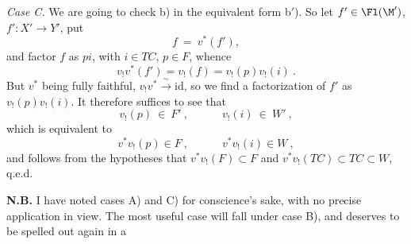 \textit{Case C.} We are going to check b) in the equivalent form b$'$). So let $f' \in \Fl(\M')$, $f' : X' \longrightarrow Y'$,
put
\[
f\ =\ v^*(f'),
\]
and factor $f$ as $pi$, with $i \in TC$, $p \in F$, whence
\[
v_!v^*(f') = v_!(f) = v_!(p)v_!(i)\ .
\]
But $v^*$ being fully faithful, $v_!v^* \xrightarrow{\ \sim\ } \mathrm{id}$, so we find a factorization of $f'$ as $v_!(p)v_!(i)$. It therefore suffices to see that
\[
v_!(p)\ \in\ F'\ ,\qquad\quad v_!(i)\ \in\ W'\ ,
\]
which is equivalent to
\[
v^*v_!(p) \in F\ ,\qquad\quad v^*v_!(i) \in W\ ,
\]
and follows from the hypotheses that $v^*v_!(F) \subset F$ and $v^*v_!(TC) \subset TC \subset W$, q.e.d.

\textbf{N.B.} I have noted cases A) and C) for conscience's sake, with no precise application in view. The most useful case will fall under case B), and deserves to be spelled out again in a

